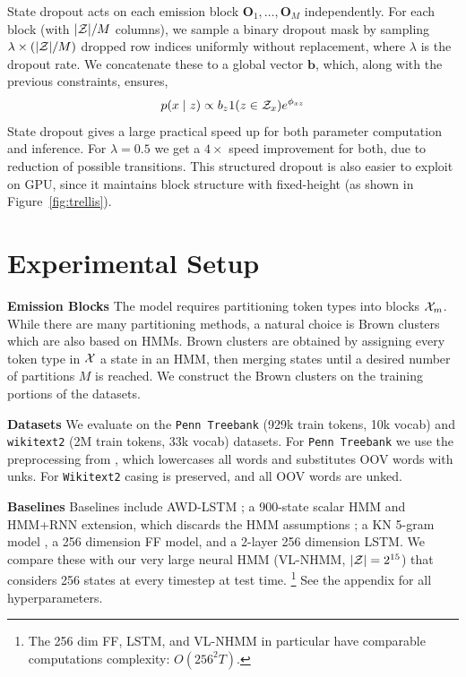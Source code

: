 \documentclass[11pt,a4paper]{article}
\begin{document}
State dropout acts on each emission block $\mathbf{O}_1, \ldots, \mathbf{O}_M$ independently.
For each block (with $|{\cal Z}| / M$ columns), we sample a binary dropout mask by sampling
$ \lambda \times(|{\cal Z}| / M)$ dropped row indices uniformly without replacement,
where $\lambda$ is the dropout rate.
We concatenate these to a global vector $\mathbf{b}$, which, along with the previous constraints, 
ensures,
\begin{equation}
\label{eqn:state_dropout}
p(x \mid z) \propto b_{z}1(z \in \mathcal{Z}_x)e^{\phi_{xz}}
\end{equation}
State dropout gives a large practical speed up for both parameter computation and inference.
For $\lambda=0.5$ we get a $4\times$ speed improvement for both,
due to reduction of possible transitions.
This structured dropout is also easier to exploit on GPU,
since it maintains block structure with fixed-height (as shown in Figure~\ref{fig:trellis}).


\section{Experimental Setup}
\label{sec:experiments}

\textbf{Emission Blocks}
The model requires partitioning token types into blocks $\mathcal{X}_m$. 
While there are many partitioning methods, a natural choice
is Brown clusters \citep{brown1992,liang2005brown} which are also based on HMMs.
Brown clusters are obtained by assigning every token type in $\mathcal{X}$ a state in an HMM,
then merging states until a desired number of partitions $M$ is reached.
We construct the Brown clusters on the training portions of the datasets.

\noindent \textbf{Datasets}
We evaluate on the \texttt{Penn Treebank} \citep{ptb} (929k train tokens, 10k vocab)
and \texttt{wikitext2} \citep{wikitext} (2M train tokens, 33k vocab) datasets.
For \texttt{Penn Treebank} we use the preprocessing from \citet{mikolov-2011},
which lowercases all words and substitutes OOV words with unks. 
For \texttt{Wikitext2} casing is preserved, and all OOV words are unked.

\noindent \textbf{Baselines}
Baselines include AWD-LSTM \citep{merity2017awdlstm};
a 900-state scalar HMM and HMM+RNN extension,
which discards the HMM assumptions \citep{buys2018hmm};
a KN 5-gram model \citep{mikolov2012rnn,kenlm},
a 256 dimension FF model,
and a 2-layer 256 dimension LSTM.
We compare these with our very large neural HMM (VL-NHMM, $|\mathcal{Z}|=2^{15}$)
that considers 256 states at every timestep at test time.
\footnote{
The 256 dim FF, LSTM, and VL-NHMM in particular
have comparable computations complexity: $O(256^2 T)$.
}
See the appendix for all hyperparameters.
\end{document}
